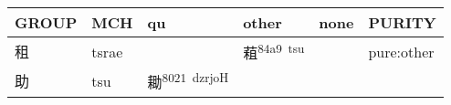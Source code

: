 \documentclass[14pt,a4paper]{scrartcl}
\begin{document}
\begin{longtable}[c]{@{}llllll@{}}
\toprule
\begin{minipage}[b]{0.14\columnwidth}\raggedright\strut
GROUP
\strut\end{minipage} &
\begin{minipage}[b]{0.14\columnwidth}\raggedright\strut
MCH
\strut\end{minipage} &
\begin{minipage}[b]{0.14\columnwidth}\raggedright\strut
qu
\strut\end{minipage} &
\begin{minipage}[b]{0.14\columnwidth}\raggedright\strut
other
\strut\end{minipage} &
\begin{minipage}[b]{0.14\columnwidth}\raggedright\strut
none
\strut\end{minipage} &
\begin{minipage}[b]{0.14\columnwidth}\raggedright\strut
PURITY
\strut\end{minipage}\tabularnewline
\midrule
\endhead
\begin{minipage}[t]{0.14\columnwidth}\raggedright\strut
租
\strut\end{minipage} &
\begin{minipage}[t]{0.14\columnwidth}\raggedright\strut
tsrae
\strut\end{minipage} &
\begin{minipage}[t]{0.14\columnwidth}\raggedright\strut
\strut\end{minipage} &
\begin{minipage}[t]{0.14\columnwidth}\raggedright\strut
蒩\textsuperscript{84a9~tsu}
\strut\end{minipage} &
\begin{minipage}[t]{0.14\columnwidth}\raggedright\strut
\strut\end{minipage} &
\begin{minipage}[t]{0.14\columnwidth}\raggedright\strut
pure:other
\strut\end{minipage}\tabularnewline
\begin{minipage}[t]{0.14\columnwidth}\raggedright\strut
助
\strut\end{minipage} &
\begin{minipage}[t]{0.14\columnwidth}\raggedright\strut
tsu
\strut\end{minipage} &
\begin{minipage}[t]{0.14\columnwidth}\raggedright\strut
耡\textsuperscript{8021~dzrjoH}
\strut\end{minipage} &

\end{longtable}
\end{document}
